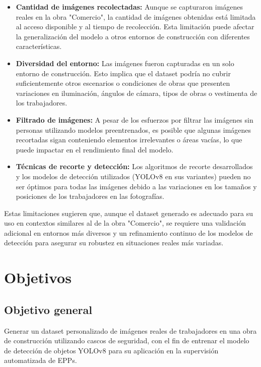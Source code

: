 \begin{itemize}
  \item \textbf{Cantidad de imágenes recolectadas:} Aunque se capturaron imágenes reales en la obra "Comercio", la cantidad de imágenes obtenidas está limitada al acceso disponible y al tiempo de recolección. Esta limitación puede afectar la generalización del modelo a otros entornos de construcción con diferentes características.
  \item \textbf{Diversidad del entorno:} Las imágenes fueron capturadas en un solo entorno de construcción. Esto implica que el dataset podría no cubrir suficientemente otros escenarios o condiciones de obras que presenten variaciones en iluminación, ángulos de cámara, tipos de obras o vestimenta de los trabajadores.
  \item \textbf{Filtrado de imágenes:} A pesar de los esfuerzos por filtrar las imágenes sin personas utilizando modelos preentrenados, es posible que algunas imágenes recortadas sigan conteniendo elementos irrelevantes o áreas vacías, lo que puede impactar en el rendimiento final del modelo.
  \item \textbf{Técnicas de recorte y detección:} Los algoritmos de recorte desarrollados y los modelos de detección utilizados (YOLOv8 en sus variantes) pueden no ser óptimos para todas las imágenes debido a las variaciones en los tamaños y posiciones de los trabajadores en las fotografías.
\end{itemize}

Estas limitaciones sugieren que, aunque el dataset generado es adecuado para su uso en contextos similares al de la obra "Comercio", se requiere una validación adicional en entornos más diversos y un refinamiento continuo de los modelos de detección para asegurar su robustez en situaciones reales más variadas.

\section{Objetivos}

\subsection{Objetivo general}

Generar un dataset personalizado de imágenes reales de trabajadores en una obra de construcción utilizando cascos de seguridad, con el fin de entrenar el modelo de detección de objetos YOLOv8 para su aplicación en la supervisión automatizada de EPPs.

